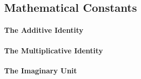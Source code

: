 











\subsection{Mathematical Constants}





\paragraph{The Additive Identity} 

\paragraph{The Multiplicative Identity} 

\paragraph{The Imaginary Unit}

